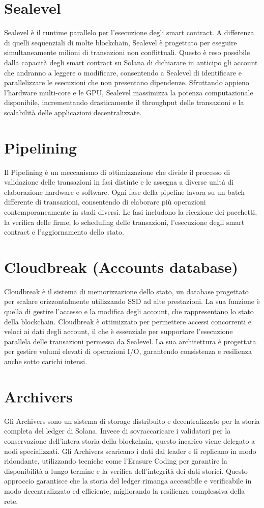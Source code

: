 \documentclass[a4paper,12pt]{report}
\begin{document}
	\section{Sealevel}
	Sealevel è il runtime parallelo per l'esecuzione degli smart contract. A differenza di quelli sequenziali di molte blockchain, Sealevel è progettato per eseguire simultaneamente milioni di transazioni non conflittuali. Questo è reso possibile dalla capacità degli smart contract su Solana di dichiarare in anticipo gli account che andranno a leggere o modificare, consentendo a Sealevel di identificare e parallelizzare le esecuzioni che non presentano dipendenze. Sfruttando appieno l'hardware multi-core e le GPU, Sealevel massimizza la potenza computazionale disponibile, incrementando drasticamente il throughput delle transazioni e la scalabilità delle applicazioni decentralizzate.
	
	\section{Pipelining}
	Il Pipelining è un meccanismo di ottimizzazione che divide il processo di validazione delle transazioni in fasi distinte e le assegna a diverse unità di elaborazione hardware e software. Ogni fase della pipeline lavora su un batch differente di transazioni, consentendo di elaborare più operazioni contemporaneamente in stadi diversi. Le fasi includono la ricezione dei pacchetti, la verifica delle firme, lo scheduling delle transazioni, l'esecuzione degli smart contract e l'aggiornamento dello stato.
	
	\section{Cloudbreak (Accounts database)}
	Cloudbreak è il sistema di memorizzazione dello stato, un database progettato per scalare orizzontalmente utilizzando SSD ad alte prestazioni. La sua funzione è quella di gestire l'accesso e la modifica degli account, che rappresentano lo stato della blockchain. Cloudbreak è ottimizzato per permettere accessi concorrenti e veloci ai dati degli account, il che è essenziale per supportare l'esecuzione parallela delle transazioni permessa da Sealevel. La sua architettura è progettata per gestire volumi elevati di operazioni I/O, garantendo consistenza e resilienza anche sotto carichi intensi.
	
	\section{Archivers}
	Gli Archivers sono un sistema di storage distribuito e decentralizzato per la storia completa del ledger di Solana. Invece di sovraccaricare i validatori per la conservazione dell'intera storia della blockchain, questo incarico viene delegato a nodi specializzati. Gli Archivers scaricano i dati dal leader e li replicano in modo ridondante, utilizzando tecniche come l'Erasure Coding per garantire la disponibilità a lungo termine e la verifica dell'integrità dei dati storici. Questo approccio garantisce che la storia del ledger rimanga accessibile e verificabile in modo decentralizzato ed efficiente, migliorando la resilienza complessiva della rete.
	
\end{document}
